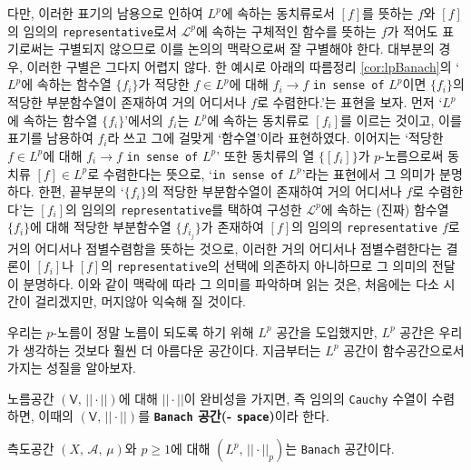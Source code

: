 다만, 이러한 표기의 남용으로 인하여 $L^p$에 속하는 동치류로서 $[f]$를 뜻하는 $f$와 $[f]$의 임의의 \texttt{representative}로서 $\mathcal{L}^p$에 속하는 구체적인 함수를 뜻하는 $f$가 적어도 표기로써는 구별되지 않으므로 이를 논의의 맥락으로써 잘 구별해야 한다. 대부분의 경우, 이러한 구별은 그다지 어렵지 않다. 한 예시로 아래의 따름정리 \ref{cor:lpBanach}의 `$L^p$에 속하는 함수열 $\{f_i\}$가 적당한 $f\in L^p$에 대해 $f_i\to f$ \texttt{in sense of} $L^p$이면 $\{f_i\}$의 적당한 부분함수열이 존재하여 거의 어디서나 $f$로 수렴한다.'는 표현을 보자. 먼저 `$L^p$에 속하는 함수열 $\{f_i\}$'에서의 $f_i$는 $L^p$에 속하는 동치류로 $[f_i]$를 이르는 것이고, 이를 표기를 남용하여 $f_i$라 쓰고 그에 걸맞게 `함수열'이라 표현하였다. 이어지는 `적당한 $f\in L^p$에 대해 $f_i\to f$ \texttt{in sense of} $L^p$' 또한 동치류의 열 $\{[f_i]\}$가 $p$-노름으로써 동치류 $[f]\in L^p$로 수렴한다는 뜻으로, `\texttt{in sense of} $L^p$'라는 표현에서 그 의미가 분명하다. 한편, 끝부분의 `$\{f_i\}$의 적당한 부분함수열이 존재하여 거의 어디서나 $f$로 수렴한다'는 $[f_i]$의 임의의 \texttt{representative}를 택하여 구성한 $\mathcal{L}^p$에 속하는 (진짜) 함수열 $\{f_i\}$에 대해 적당한 부분함수열 $\{f_{i_j}\}$가 존재하여 $[f]$의 임의의 \texttt{representative} $f$로 거의 어디서나 점별수렴함을 뜻하는 것으로, 이러한 거의 어디서나 점별수렴한다는 결론이 $[f_i]$나 $[f]$의 \texttt{representative}의 선택에 의존하지 아니하므로 그 의미의 전달이 분명하다. 이와 같이 맥락에 따라 그 의미를 파악하며 읽는 것은, 처음에는 다소 시간이 걸리겠지만, 머지않아 익숙해 질 것이다.

우리는 $p$-노름이 정말 노름이 되도록 하기 위해 $L^p$ 공간을 도입했지만, $L^p$ 공간은 우리가 생각하는 것보다 훨씬 더 아름다운 공간이다. 지금부터는 $L^p$ 공간이 함수공간으로서 가지는 성질을 알아보자.

\begin{definition}
    노름공간 $(\mathsf{V},\,||\cdot||)$에 대해 $||\cdot||$이 완비성을 가지면, 즉 임의의 \texttt{Cauchy} 수열이 수렴하면, 이때의 $(\mathsf{V},\,||\cdot||)$를 \textbf{\texttt{Banach} 공간(- \texttt{space})}이라 한다.
\end{definition}

\begin{theorem}\label{thm:lpBanach}
    측도공간 $(X,\,\mathcal{A},\,\mu)$와 $p\geq1$에 대해 $(L^p,\,||\cdot||_p)$는 \texttt{Banach} 공간이다.
\end{theorem}

